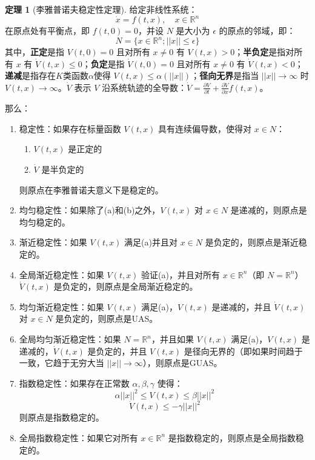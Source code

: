 \documentclass[UTF8,12pt,a4paper]{ctexart}
\theoremstyle{definition}
\newtheorem{theorem}{定理}[section]
\begin{document}
\begin{theorem}[李雅普诺夫稳定性定理]\label{thm:lyapunov}
给定非线性系统：
\[
\dot{x} = f(t, x), \quad x \in \mathbb{R}^n
\]
在原点处有平衡点，即 $f(t, 0)=0$，并设 $N$ 是大小为 $\epsilon$ 的原点的邻域，即：
\[
N = \{x \in \mathbb{R}^n; ||x|| \leq \epsilon\}
\]
其中，\textbf{正定}是指 $V(t,0)=0$ 且对所有 $x \neq 0$ 有 $V(t,x)>0$；\textbf{半负定}是指对所有 $x$ 有 $\dot{V}(t,x) \leq 0$；\textbf{负定}是指 $\dot{V}(t,0)=0$ 且对所有 $x \neq 0$ 有 $\dot{V}(t,x)<0$；\textbf{递减}是指存在$K$类函数$\alpha$使得 $V(t,x) \leq \alpha(||x||)$；\textbf{径向无界}是指当 $||x|| \rightarrow \infty$ 时 $V(t,x) \rightarrow \infty$。$\dot{V}$ 表示 $V$ 沿系统轨迹的全导数：$\dot{V} = \frac{\partial V}{\partial t} + \frac{\partial V}{\partial x}f(t,x)$。

那么：
\begin{enumerate}
\item 稳定性：如果存在标量函数 $V(t, x)$ 具有连续偏导数，使得对 $x \in N$：
\begin{enumerate}
\item $V(t, x)$ 是正定的
\item $\dot{V}$ 是半负定的
\end{enumerate}
则原点在李雅普诺夫意义下是稳定的。

\item 均匀稳定性：如果除了(a)和(b)之外，$V(t, x)$ 对 $x \in N$ 是递减的，则原点是均匀稳定的。

\item 渐近稳定性：如果 $V(t, x)$ 满足(a)并且对 $x \in N$ 是负定的，则原点是渐近稳定的。

\item 全局渐近稳定性：如果 $V(t, x)$ 验证(a)，并且对所有 $x \in \mathbb{R}^n$（即 $N=\mathbb{R}^n$）$\dot{V}(t, x)$ 是负定的，则原点是全局渐近稳定的。

\item 均匀渐近稳定性：如果 $V(t, x)$ 满足(a)，$V(t, x)$ 是递减的，并且 $\dot{V}(t, x)$ 对 $x \in N$ 是负定的，则原点是UAS。

\item 全局均匀渐近稳定性：如果 $N=\mathbb{R}^n$，并且如果 $V(t, x)$ 满足(a)，$V(t, x)$ 是递减的，$\dot{V}(t, x)$ 是负定的，并且 $V(t, x)$ 是径向无界的（即如果时间趋于一致，它趋于无穷大当 $||x|| \rightarrow \infty$），则原点是GUAS。

\item 指数稳定性：如果存在正常数 $\alpha, \beta, \gamma$ 使得：
\[
\alpha ||x||^2 \leq V(t, x) \leq \beta ||x||^2
\]
\[
\dot{V}(t, x) \leq -\gamma ||x||^2
\]
则原点是指数稳定的。

\item 全局指数稳定性：如果它对所有 $x \in \mathbb{R}^n$ 是指数稳定的，则原点是全局指数稳定的。
\end{enumerate}
\end{theorem}
\end{document}

